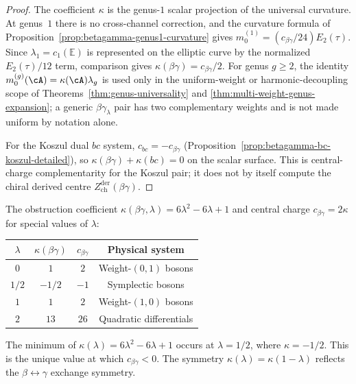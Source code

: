 \begin{proof}
The coefficient $\kappa$ is the genus-$1$ scalar projection of the
universal curvature. At genus~$1$ there is no cross-channel
correction, and the curvature formula of
Proposition~\ref{prop:betagamma-genus1-curvature} gives
$m_0^{(1)}=(c_{\beta\gamma}/24)E_2(\tau)$. Since
$\lambda_1=c_1(\mathbb E)$ is represented on the elliptic curve by
the normalized $E_2(\tau)/12$ term, comparison gives
$\kappa(\beta\gamma) = c_{\beta\gamma}/2$.
For genus $g\ge2$, the identity
$m_0^{(g)}(\cA)=\kappa(\cA)\lambda_g$ is used only in the
uniform-weight or harmonic-decoupling scope of
Theorems~\ref{thm:genus-universality} and
\ref{thm:multi-weight-genus-expansion}; a generic
$\beta\gamma_\lambda$ pair has two complementary weights and is not
made uniform by notation alone.

For the Koszul dual $bc$ system,
$c_{bc} = -c_{\beta\gamma}$
(Proposition~\ref{prop:betagamma-bc-koszul-detailed}),
so $\kappa(\beta\gamma)+\kappa(bc)=0$ on the scalar surface. This is
central-charge complementarity for the Koszul pair; it does not by
itself compute the chiral derived centre
$Z^{\mathrm{der}}_{\mathrm{ch}}(\beta\gamma)$.
\end{proof}

\begin{computation}
\label{comp:betagamma-curvature-table}
The obstruction coefficient $\kappa(\beta\gamma,\lambda)
= 6\lambda^2 - 6\lambda + 1$ and central charge
$c_{\beta\gamma} = 2\kappa$ for special values of $\lambda$:

\begin{center}
\begin{tabular}{cccc}
\toprule
$\lambda$ & $\kappa(\beta\gamma)$ & $c_{\beta\gamma}$ & Physical system \\
\midrule
$0$ & $1$ & $2$ & Weight-$(0,1)$ bosons \\
$1/2$ & $-1/2$ & $-1$ & Symplectic bosons \\
$1$ & $1$ & $2$ & Weight-$(1,0)$ bosons \\
$2$ & $13$ & $26$ & Quadratic differentials \\
\bottomrule
\end{tabular}
\end{center}

The minimum of $\kappa(\lambda) = 6\lambda^2 - 6\lambda + 1$
occurs at $\lambda = 1/2$, where $\kappa = -1/2$. This is the
unique value at which $c_{\beta\gamma} < 0$. The symmetry
$\kappa(\lambda) = \kappa(1-\lambda)$ reflects the $\beta
\leftrightarrow \gamma$ exchange symmetry.
\end{computation}

